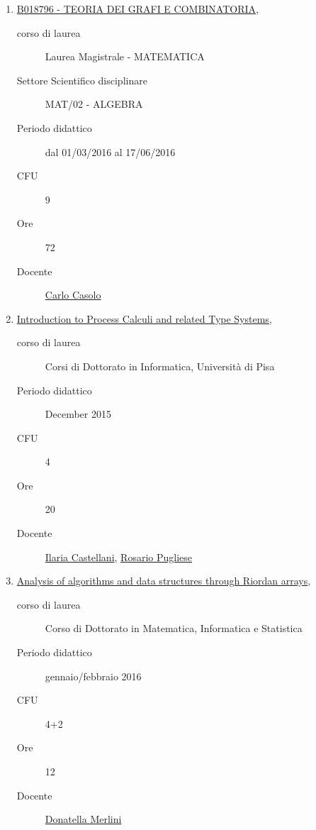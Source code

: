 \documentclass[11pt]{article}
\begin{document}
\begin{enumerate}

\item \href{http://www.unifi.it/index.php?module=ofform2&mode=1&cmd=3&AA=2015&afId=426613}{B018796 - TEORIA DEI GRAFI E COMBINATORIA},
    \begin{description}
        \item[corso di laurea] Laurea Magistrale - MATEMATICA
        \item[Settore Scientifico disciplinare] MAT/02 - ALGEBRA
        \item[Periodo didattico] dal 01/03/2016 al 17/06/2016
        \item[CFU] 9
        \item[Ore] 72
        \item[Docente] \href{http://www.unifi.it/p-doc2-2015-0-A-2b333a29342e-0.html}{Carlo Casolo}

    \end{description}

\item \href{}{Introduction to Process Calculi and related Type Systems},
    \begin{description}
        \item[corso di laurea] Corsi di Dottorato in Informatica, Universit\`a di Pisa
        \item[Periodo didattico] December 2015
        \item[CFU] 4 
        \item[Ore] 20
        \item[Docente] \href{http://www-sop.inria.fr/members/Ilaria.Castellani/Home.html}{Ilaria Castellani}, 
            \href{http://local.disia.unifi.it/pugliese/}{Rosario Pugliese} 

    \end{description}

\item \href{}{Analysis of algorithms and data structures through Riordan arrays},
    \begin{description}
        \item[corso di laurea] Corso di Dottorato in Matematica, Informatica e Statistica
        \item[Periodo didattico] gennaio/febbraio 2016
        \item[CFU] 4+2
        \item[Ore] 12
        \item[Docente] \href{http://local.disia.unifi.it/merlini/}{Donatella Merlini}

    \end{description}
\end{enumerate}
\end{document}
